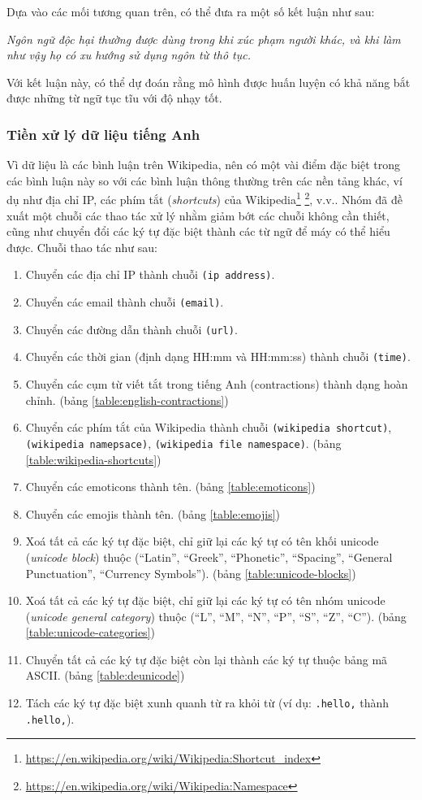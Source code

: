 Dựa vào các mối tương quan trên, có thể đưa ra một số kết luận như sau:

\textit{Ngôn ngữ độc hại thường được dùng trong khi xúc phạm người khác, và khi làm như vậy họ có xu hướng sử dụng ngôn từ thô tục.}

Với kết luận này, có thể dự đoán rằng mô hình được huấn luyện có khả năng bắt được những từ ngữ tục tĩu với độ nhạy tốt.

\subsubsection{Tiền xử lý dữ liệu tiếng Anh}\label{english-preprocess}
Vì dữ liệu là các bình luận trên Wikipedia, nên có một vài điểm đặc biệt trong các bình luận này so với các bình luận thông thường trên các nền tảng khác, ví dụ như địa chỉ IP, các phím tắt (\textit{shortcuts}) của Wikipedia\footnote{\url{https://en.wikipedia.org/wiki/Wikipedia:Shortcut_index}} \footnote{\url{https://en.wikipedia.org/wiki/Wikipedia:Namespace}}, v.v.. Nhóm đã đề xuất một chuỗi các thao tác xử lý nhằm giảm bớt các chuỗi không cần thiết, cũng như chuyển đổi các ký tự đặc biệt thành các từ ngữ để máy có thể hiểu được. Chuỗi thao tác như sau:
\begin{enumerate}
    \item Chuyển các địa chỉ IP thành chuỗi \texttt{(ip address)}.
    \item Chuyển các email thành chuỗi \texttt{(email)}.
    \item Chuyển các đường dẫn thành chuỗi \texttt{(url)}.
    \item Chuyển các thời gian (định dạng HH:mm và HH:mm:ss) thành chuỗi \texttt{(time)}.
    \item Chuyển các cụm từ viết tắt trong tiếng Anh (contractions) thành dạng hoàn chỉnh. (bảng \ref{table:english-contractions})
    \item Chuyển các phím tắt của Wikipedia thành chuỗi \texttt{(wikipedia shortcut)}, \\\texttt{(wikipedia namepsace)}, \texttt{(wikipedia file namespace)}. (bảng \ref{table:wikipedia-shortcuts})
    \item Chuyển các emoticons thành tên. (bảng \ref{table:emoticons})
    \item Chuyển các emojis thành tên. (bảng \ref{table:emojis})
    \item Xoá tất cả các ký tự đặc biệt, chỉ giữ lại các ký tự có tên khối unicode (\textit{unicode block}) thuộc (``Latin'', ``Greek'', ``Phonetic'', ``Spacing'', ``General Punctuation'', ``Currency Symbols''). (bảng \ref{table:unicode-blocks})
    \item Xoá tất cả các ký tự đặc biệt, chỉ giữ lại các ký tự có tên nhóm unicode (\textit{unicode general category}) thuộc (``L'', ``M'', ``N'', ``P'', ``S'', ``Z'', ``C''). (bảng \ref{table:unicode-categories})
    \item Chuyển tất cả các ký tự đặc biệt còn lại thành các ký tự thuộc bảng mã ASCII. (bảng \ref{table:deunicode})
    \item Tách các ký tự đặc biệt xunh quanh từ ra khỏi từ (ví dụ: {\tt .hello,} thành {\tt .\textvisiblespace hello\textvisiblespace,}).
\end{enumerate}

